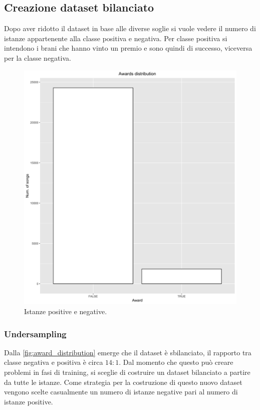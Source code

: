 \subsection{Creazione dataset bilanciato}
Dopo aver ridotto il dataset in base alle diverse soglie si vuole
vedere il numero di istanze appartenente alla classe positiva e
negativa. Per classe positiva si intendono i brani che hanno vinto un
premio e sono quindi di successo, viceversa per la classe negativa.

\begin{figure}[H]
	\centering
	\includegraphics[width=14cm]{../images/awards_distribution.png}
	\caption{Istanze positive e negative.}
	\label{fig:award_distribution}
\end{figure}

\subsubsection{Undersampling}
Dalla \autoref{fig:award_distribution} emerge che il dataset è
sbilanciato, il rapporto tra classe negativa e positiva è circa
$14:1$. Dal momento che questo può creare problemi in fasi di
training, si sceglie di costruire un dataset bilanciato a partire da
tutte le istanze. Come strategia per la costruzione di questo nuovo
dataset vengono scelte casualmente un numero di istanze negative pari
al numero di istanze positive.

